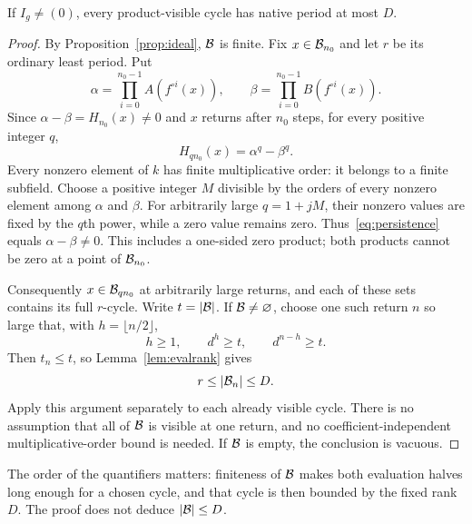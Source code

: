 \begin{proposition}\label{prop:period}
If $I_g\ne(0)$, every product-visible cycle has native period at
most $D$.
\end{proposition}
\begin{proof}
By Proposition~\ref{prop:ideal}, $\mathcal B$ is finite. Fix
$x\in\mathcal B_{n_0}$ and let $r$ be its ordinary least period.
Put
\[
 \alpha=\prod_{i=0}^{n_0-1}A(f^{\circ i}(x)),\qquad
 \beta=\prod_{i=0}^{n_0-1}B(f^{\circ i}(x)).
\]
Since $\alpha-\beta=H_{n_0}(x)\ne0$ and $x$ returns after
$n_0$ steps, for every positive integer $q$,
\begin{equation}\label{eq:persistence}
 H_{qn_0}(x)=\alpha^q-\beta^q.
\end{equation}
Every nonzero element of $k$ has finite multiplicative order: it
belongs to a finite subfield. Choose a positive integer $M$
divisible by the orders of every nonzero element among $\alpha$
and $\beta$. For arbitrarily large $q=1+jM$, their nonzero
values are fixed by the $q$th power, while a zero value remains
zero. Thus~\eqref{eq:persistence} equals $\alpha-\beta\ne0$.
This includes a one-sided zero product; both products cannot be
zero at a point of $\mathcal B_{n_0}$.

Consequently $x\in\mathcal B_{qn_0}$ at arbitrarily large returns,
and each of these sets contains its full $r$-cycle. Write
$t=|\mathcal B|$. If $\mathcal B\ne\varnothing$, choose one such return
$n$ so large that, with $h=\lfloor n/2\rfloor$,
\[
 h\ge1,\qquad d^h\ge t,\qquad d^{n-h}\ge t.
\]
Then $t_n\le t$, so Lemma~\ref{lem:evalrank} gives
\begin{equation}\label{eq:periodbound}
 r\le|\mathcal B_n|\le D.
\end{equation}
Apply this argument separately to each already visible cycle.
There is no assumption that all of $\mathcal B$ is visible at one
return, and no coefficient-independent multiplicative-order bound
is needed. If $\mathcal B$ is empty, the conclusion is vacuous.
\end{proof}

The order of the quantifiers matters: finiteness of $\mathcal B$ makes
both evaluation halves long enough for a chosen cycle, and that
cycle is then bounded by the fixed rank $D$. The proof does not
deduce $|\mathcal B|\le D$.
